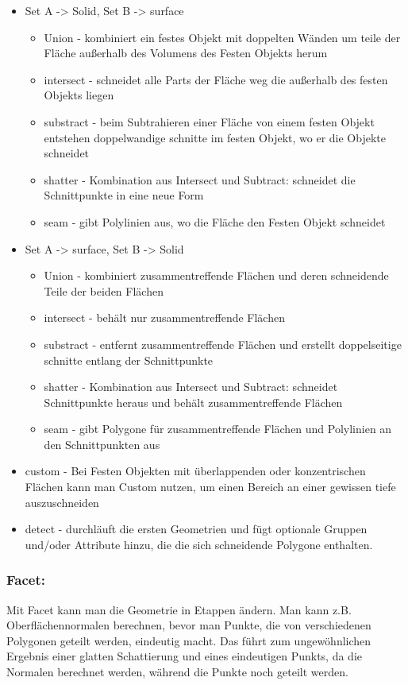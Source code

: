\documentclass[paper=a4,fontsize=12pt,ngerman]{scrartcl}
\begin{document}
\begin{itemize}
		\item Set A -> Solid, Set B -> surface
		\begin{itemize}
			\item Union - kombiniert ein festes Objekt mit doppelten Wänden um teile der Fläche außerhalb des Volumens des Festen Objekts herum
			\item intersect - schneidet alle Parts der Fläche weg die außerhalb des festen Objekts liegen
			\item substract - beim Subtrahieren einer Fläche von einem festen Objekt entstehen doppelwandige schnitte im festen Objekt, wo er die Objekte schneidet
			\item shatter - Kombination aus Intersect und Subtract: schneidet die Schnittpunkte in eine neue Form
			\item seam - gibt Polylinien aus, wo die Fläche den Festen Objekt schneidet
		\end{itemize}
		\item Set A -> surface, Set B -> Solid
		\begin{itemize}
			\item Union - kombiniert zusammentreffende Flächen und deren schneidende Teile der beiden Flächen
			\item intersect - behält nur zusammentreffende Flächen
			\item substract - entfernt zusammentreffende Flächen und erstellt doppelseitige schnitte entlang der Schnittpunkte
			\item shatter - Kombination aus Intersect und Subtract:  schneidet Schnittpunkte heraus und behält zusammentreffende Flächen 
			\item seam - gibt Polygone für zusammentreffende Flächen und Polylinien an den Schnittpunkten aus 
		\end{itemize}
		\item custom	- Bei Festen Objekten mit überlappenden oder konzentrischen Flächen kann man Custom nutzen, um einen Bereich an einer gewissen tiefe auszuschneiden
		\item detect	- durchläuft die ersten Geometrien und fügt optionale Gruppen und/oder Attribute hinzu, die die sich schneidende Polygone enthalten.
	\end{itemize}
	\subsubsection*{Facet:}
	Mit Facet kann man die Geometrie in Etappen ändern. Man kann z.B. Oberflächennormalen berechnen, bevor man Punkte, die von verschiedenen Polygonen geteilt werden, eindeutig macht. Das führt zum ungewöhnlichen Ergebnis einer glatten Schattierung und eines eindeutigen Punkts, da die Normalen berechnet werden, während die Punkte noch geteilt werden. 
\end{document}
